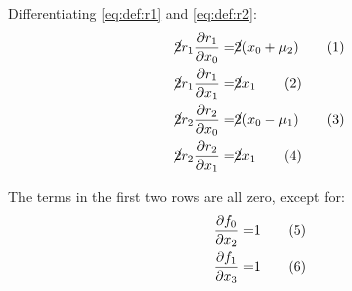 \documentclass[]{article}
\newcommand\numberthis{\addtocounter{equation}{1}\tag{\theequation}}
\begin{document}
Differentiating \eqref{eq:def:r1} and \eqref{eq:def:r2}:  
\begin{align*}
	\cancel{2}r_1\frac{\partial r_1}{\partial x_0} =& \cancel{2}(x_0+\mu_2) \numberthis \label{eq:dr1:dx0}\\
	\cancel{2}r_1\frac{\partial r_1}{\partial x_1} =& \cancel{2} x_1 \numberthis \label{eq:dr1:dx1}\\
	\cancel{2}r_2\frac{\partial r_2}{\partial x_0} =& \cancel{2}(x_0-\mu_1) \numberthis \label{eq:dr2:dx0}\\
	\cancel{2}r_2\frac{\partial r_2}{\partial x_1} =& \cancel{2} x_1\numberthis \label{eq:dr2:dx1}
\end{align*}

The terms in the first two rows are all zero, except for:
\begin{align*}
	\frac{\partial f_0}{\partial x_2} =& 1 \numberthis \label{eq:J02}\\
	\frac{\partial f_1}{\partial x_3} =& 1 \numberthis \label{eq:J13}
\end{align*}
\end{document}
